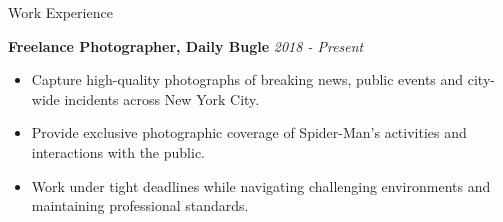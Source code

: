 \documentclass{resume}
\begin{document}
\begin{rSection}{Work Experience}

{\bf Freelance Photographer, Daily Bugle} \hfill {\em 2018 - Present} 

\begin{itemize} 
		\vspace{-0.1cm}\item Capture high-quality photographs of breaking news, public events and city-wide incidents across New York City.
        \vspace{-0.3cm}\item Provide exclusive photographic coverage of Spider-Man's activities and interactions with the public.
        \vspace{-0.3cm}\item Work under tight deadlines while navigating challenging environments and maintaining professional standards.
\end{itemize}

\end{rSection}
\end{document}
